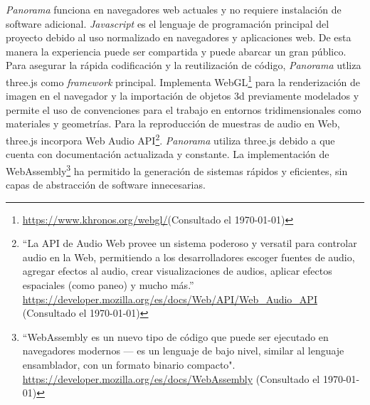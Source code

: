 
\textit{Panorama} funciona en navegadores web actuales y no requiere instalación de software adicional. \textit{Javascript} es el lenguaje de programación principal del proyecto debido al uso normalizado en navegadores y aplicaciones web. De esta manera la experiencia puede ser compartida y puede abarcar un gran público. Para asegurar la rápida codificación y la reutilización de código, \textit{Panorama} utliza three.js como \textit{framework} principal. Implementa WebGL\footnote{\url{https://www.khronos.org/webgl/}(Consultado el \today)} para la renderización de imagen en el navegador y la importación de objetos 3d previamente modelados y permite el uso de convenciones para el trabajo en entornos tridimensionales como materiales y geometrías. Para la reproducción de muestras de audio en Web, three.js incorpora Web Audio API\footnote{``La API de Audio Web provee un sistema poderoso y versatil para controlar audio en la Web, permitiendo a los desarrolladores escoger fuentes de audio, agregar efectos al audio, crear visualizaciones de audios, aplicar efectos espaciales (como paneo) y mucho más.'' \url{https://developer.mozilla.org/es/docs/Web/API/Web_Audio_API} (Consultado el \today)}. \textit{Panorama} utiliza three.js debido a que cuenta con documentación actualizada y constante. La implementación de WebAssembly\footnote{``WebAssembly es un nuevo tipo de código que puede ser ejecutado en navegadores modernos — es un lenguaje de bajo nivel, similar al lenguaje ensamblador, con un formato binario compacto". \url{https://developer.mozilla.org/es/docs/WebAssembly} (Consultado el \today) } ha permitido la generación de sistemas rápidos y eficientes, sin capas de abstracción de software innecesarias. %

\color{BlueGreen}
  
